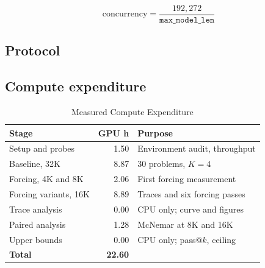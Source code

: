 \documentclass[conference]{IEEEtran}
\newif\ifdraft
\newcommand{\writehere}[2]{%
  \ifdraft
    {\color{orange!75!black}\small\textbf{[WRITE: #1]}\itshape\ #2\par}
    \medskip
  \fi}
\begin{document}
\begin{equation}
\text{concurrency} = \frac{192{,}272}{\texttt{max\_model\_len}}
\label{eq:conc}
\end{equation}

\subsection{Protocol}

\writehere{2 paragraphs}{
One: the controls. Decoding parameters frozen across every arm, temperature 1.0,
top-p 0.95, seed 0, $K$ equals 4 giving 120 samples per condition. Prompt from the
model's own chat template. Answer extraction finds the final boxed expression with
a brace depth parser. One shared implementation across all arms so a change cannot
apply to only one condition. Budgets of 4,096, 8,192, 16,384 and 32,768 tokens.
\\
Two: termination logging, and why it is the important part. Separating a wrong
answer from an absent one is what makes (\ref{eq:hyp}) testable. Aggregate accuracy
alone cannot support the central claim, which is why the harness records a stop
reason for every sample.}

\subsection{Compute expenditure}

\begin{table}[t]
\caption{Measured Compute Expenditure}
\label{tab:compute}
\centering
\footnotesize
\begin{tabular}{@{}L{3.1cm}rL{3.4cm}@{}}
\toprule
\textbf{Stage} & \textbf{GPU h} & \textbf{Purpose} \\
\midrule
Setup and probes & 1.50 & Environment audit, throughput \\
Baseline, 32K & 8.87 & 30 problems, $K{=}4$ \\
Forcing, 4K and 8K & 2.06 & First forcing measurement \\
Forcing variants, 16K & 8.89 & Traces and six forcing passes \\
Trace analysis & 0.00 & CPU only; curve and figures \\
Paired analysis & 1.28 & McNemar at 8K and 16K \\
Upper bounds & 0.00 & CPU only; pass@$k$, ceiling \\
\midrule
\textbf{Total} & \textbf{22.60} & \\
\bottomrule
\end{tabular}
\end{table}
\end{document}
